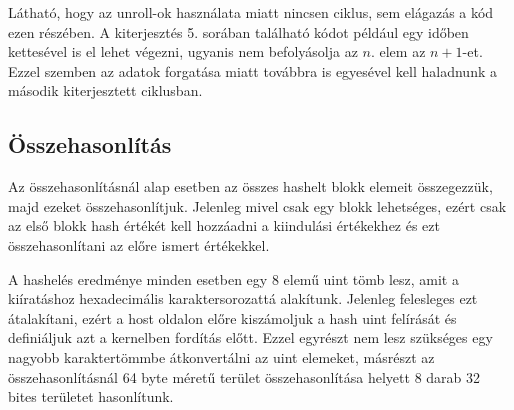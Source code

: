 Látható, hogy az unroll-ok használata miatt nincsen ciklus, sem elágazás a kód ezen részében. A kiterjesztés 5. sorában található kódot például egy időben kettesével is el lehet végezni, ugyanis nem befolyásolja az $n.$ elem az $n+1$-et. Ezzel szemben az adatok forgatása miatt továbbra is egyesével kell haladnunk a második kiterjesztett ciklusban.


\subsection{Összehasonlítás}

Az összehasonlításnál alap esetben az összes hashelt blokk elemeit összegezzük, majd ezeket összehasonlítjuk. Jelenleg mivel csak egy blokk lehetséges, ezért csak az első blokk hash értékét kell hozzáadni a kiindulási értékekhez és ezt összehasonlítani az előre ismert értékekkel.

A hashelés eredménye minden esetben egy 8 elemű uint tömb lesz, amit a kiíratáshoz hexadecimális karaktersorozattá alakítunk. Jelenleg felesleges ezt átalakítani, ezért a host oldalon előre kiszámoljuk a hash uint felírását és definiáljuk azt a kernelben fordítás előtt. Ezzel egyrészt nem lesz szükséges egy nagyobb karaktertömmbe átkonvertálni az uint elemeket, másrészt az összehasonlításnál 64 byte méretű terület összehasonlítása helyett 8 darab 32 bites területet hasonlítunk.

